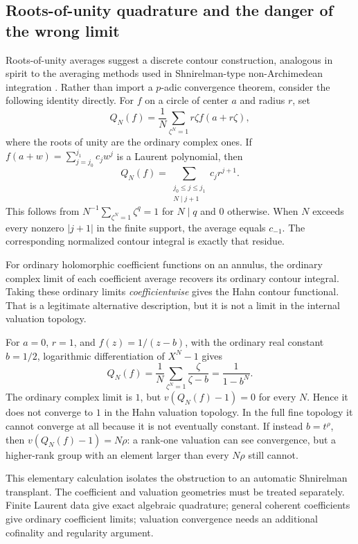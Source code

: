 \documentclass[11pt,letterpaper]{article}
\theoremstyle{definition}
\theoremstyle{remark}
\newcommand{\N}{\mathbb N}\newcommand{\Z}{\mathbb Z}
\numberwithin{equation}{section}
\begin{document}
\subsection{Roots-of-unity quadrature and the danger of the wrong limit}
Roots-of-unity averages suggest a discrete contour construction, analogous in spirit to the averaging methods used in Shnirelman-type non-Archimedean integration \cite{Ettayb}. Rather than import a $p$-adic convergence theorem, consider the following identity directly. For $f$ on a circle of center $a$ and radius $r$, set
\begin{equation}\label{eq:rootaverage}
 Q_N(f)=\frac1N\sum_{\zeta^N=1}r\zeta f(a+r\zeta),
\end{equation}
where the roots of unity are the ordinary complex ones. If $f(a+w)=\sum_{j=j_0}^{j_1}c_jw^j$ is a Laurent polynomial, then
\[
 Q_N(f)=\sum_{\substack{j_0\le j\le j_1\\N\mid j+1}}c_jr^{j+1}.
\]
This follows from $N^{-1}\sum_{\zeta^N=1}\zeta^q=1$ for $N\mid q$ and $0$ otherwise. When $N$ exceeds every nonzero $|j+1|$ in the finite support, the average equals $c_{-1}$. The corresponding normalized contour integral is exactly that residue.

For ordinary holomorphic coefficient functions on an annulus, the ordinary complex limit of each coefficient average recovers its ordinary contour integral. Taking these ordinary limits \emph{coefficientwise} gives the Hahn contour functional. That is a legitimate alternative description, but it is not a limit in the internal valuation topology.

\begin{example}\label{ex:quadrature}
For $a=0$, $r=1$, and $f(z)=1/(z-b)$, with the ordinary real constant $b=1/2$, logarithmic differentiation of $X^N-1$ gives
\[
 Q_N(f)=\frac1N\sum_{\zeta^N=1}\frac\zeta{\zeta-b}
 =\frac1{1-b^N}.
\]
The ordinary complex limit is $1$, but $v(Q_N(f)-1)=0$ for every $N$. Hence it does not converge to $1$ in the Hahn valuation topology. In the full fine topology it cannot converge at all because it is not eventually constant. If instead $b=t^\rho$, then $v(Q_N(f)-1)=N\rho$: a rank-one valuation can see convergence, but a higher-rank group with an element larger than every $N\rho$ still cannot.
\end{example}

This elementary calculation isolates the obstruction to an automatic Shnirelman transplant. The coefficient and valuation geometries must be treated separately. Finite Laurent data give exact algebraic quadrature; general coherent coefficients give ordinary coefficient limits; valuation convergence needs an additional cofinality and regularity argument.
\end{document}
